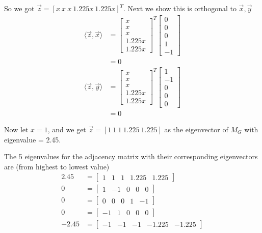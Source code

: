 \documentclass[12pt,a4paper]{article}
\begin{document}
So we got $\vec{z} = [x\ x\ x\ 1.225x\ 1.225x]^T$. Next we show this is orthogonal to $\vec{x}, \vec{y}$
\begin{align*}
    \langle \vec{z}, \vec{x} \rangle &= 
    \begin{bmatrix}
        x \\ x \\ x \\ 1.225x \\ 1.225x
    \end{bmatrix}^T
    \begin{bmatrix}
        0 \\ 0 \\ 0 \\ 1 \\ -1
    \end{bmatrix}\\
    &= 0 \\
    \langle \vec{z}, \vec{y} \rangle &= 
    \begin{bmatrix}
        x \\ x \\ x \\ 1.225x \\ 1.225x
    \end{bmatrix}^T
    \begin{bmatrix}
        1 \\ -1 \\ 0 \\ 0 \\ 0
    \end{bmatrix}\\
    &= 0
\end{align*}

Now let $x=1$, and we get $\vec{z}=[1\ 1\ 1\ 1.225\ 1.225]$ as the eigenvector of $M_G$ with eigenvalue = 2.45.

The 5 eigenvalues for the adjacency matrix with their corresponding eigenvectors are (from highest to lowest value)
\begin{align}
    2.45 &= \begin{bmatrix}
        1 & 1 & 1 & 1.225 & 1.225
    \end{bmatrix} \\
    0 &= \begin{bmatrix}
        1 & -1 & 0 & 0 & 0
    \end{bmatrix} \\
    0 &= \begin{bmatrix}
        0 & 0 & 0 & 1 & -1
    \end{bmatrix} \\
    0 &= \begin{bmatrix}
        -1 & 1 & 0 & 0 & 0
    \end{bmatrix} \\
    -2.45 &= \begin{bmatrix}
        -1 & -1 & -1 & -1.225 & -1.225
    \end{bmatrix}
\end{align}
\end{document}
